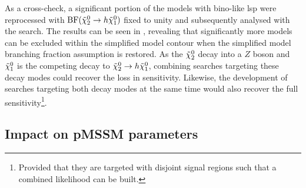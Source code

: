 As a cross-check, a significant portion of the models with bino-like \gls{lsp} were reprocessed with $\mathrm{BF}(\tilde{\chi}_2^0 \rightarrow h \tilde{\chi}_1^0)$ fixed to unity and subsequently analysed with the \onelepton search. The results can be seen in , revealing that significantly more models can be excluded within the simplified model contour when the simplified model branching fraction assumption is restored. As the $\tilde{\chi}_2^0$ decay into a $Z$ boson and $\tilde{\chi}_1^0$ is the competing decay to $\tilde{\chi}_2^0 \rightarrow h \tilde{\chi}_1^0$, combining searches targeting these decay modes could recover the loss in sensitivity. Likewise, the development of searches targeting both decay modes at the same time would also recover the full sensitivity\footnote{Provided that they are targeted with disjoint signal regions such that a combined likelihood can be built.}.  

\subsection{Impact on pMSSM parameters}

